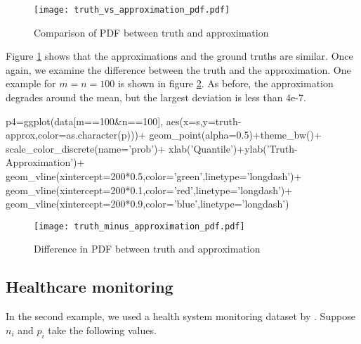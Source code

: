 
\begin{figure}[ht]
\texttt{[image: truth\_vs\_approximation\_pdf.pdf]}
\caption{Comparison of PDF between truth and approximation}
\label{fig:3}
\end{figure}

Figure \ref{fig:3} shows that the approximations and the ground truths are similar. Once again, we examine the difference between the truth and the approximation. One example for $m=n=100$ is shown in figure \ref{fig:4}. As before, the approximation degrades around the mean, but the largest deviation is less than 4e-7.


\begin{example}
p4=ggplot(data[m==100&n==100],
	aes(x=s,y=truth-approx,color=as.character(p)))+
	geom_point(alpha=0.5)+theme_bw()+
	scale_color_discrete(name='prob')+
	xlab('Quantile')+ylab('Truth-Approximation')+
	geom_vline(xintercept=200*0.5,color='green',linetype='longdash')+
	geom_vline(xintercept=200*0.1,color='red',linetype='longdash')+
	geom_vline(xintercept=200*0.9,color='blue',linetype='longdash')
\end{example}

\begin{figure}[ht]
\texttt{[image: truth\_minus\_approximation\_pdf.pdf]}
\caption{Difference in PDF between truth and approximation}
\label{fig:4}
\end{figure}


\subsection{Healthcare monitoring}
In the second example, we used a health system monitoring dataset by \cite{Benneyan:2010ex}. Suppose $n_i$ and $p_i$ take the following values. 

